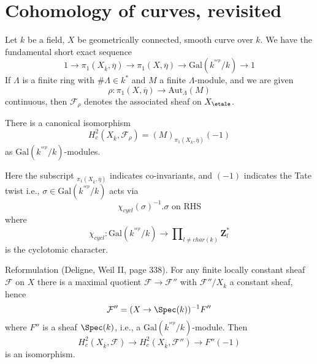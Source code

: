 \section{Cohomology of curves, revisited}
\label{section-cohomology-curves-revisited}

\noindent
Let $k$ be a field, $X$ be geometrically connected, smooth curve over $k$.
We have the fundamental short exact sequence
$$
1 \to
\pi_1(X_{\overline k}, \overline \eta) \to
\pi_1(X, \overline\eta) \to
\text{Gal}(k^{^{sep}}/k) \to 1
$$
If $\Lambda$ is a finite ring with $\#\Lambda\in k^*$ and $M$ a finite
$\Lambda$-module, and we are given
$$
\rho:\pi_1(X, \overline\eta) \to \text{Aut}_{\Lambda}(M)
$$
continuous, then $\mathcal{F}_\rho$ denotes the associated sheaf on
$X_\etale$.

\begin{lemma}
\label{lemma-identify-h2c}
There is a canonical isomorphism
$$
H_c^2(X_{\overline k}, \mathcal{F}_\rho)=(M)_{\pi_1(X_{\overline k},
\overline\eta)}(-1)
$$
as $\text{Gal}(k^{^{sep}}/k)$-modules.
\end{lemma}

\noindent
Here the subscript ${}_{\pi_1(X_{\overline k}, \overline\eta)}$
indicates co-invariants, and $(-1)$ indicates the Tate twist i.e.,
$\sigma\in \text{Gal}(k^{^{sep}}/k)$ acts via
$$
\chi_{cycl}(\sigma)^{-1}.\sigma\text{ on RHS}
$$
where
$$
\chi_{cycl} :
\text{Gal}(k^{^{sep}}/k)
\to
\prod\nolimits_{l\neq char(k)}\mathbf{Z}_l^*
$$
is the cyclotomic character.

\medskip\noindent
Reformulation (Deligne, Weil II, page 338). For any finite locally
constant sheaf $\mathcal{F}$ on $X$ there is a maximal quotient $\mathcal{F}\to
\mathcal{F}''$ with $\mathcal{F}''/X_{\overline k}$ a constant sheaf, hence
$$
\mathcal{F}'' = (X\to \Spec(k))^{-1}F''
$$
where $F''$ is a sheaf $\Spec(k)$, i.e., a
$\text{Gal}(k^{^{sep}}/k)$-module. Then
$$
H_c^2(X_{\overline k}, \mathcal{F})\to H_c^2(X_{\overline k},
\mathcal{F}'')\to F''(-1)
$$
is an isomorphism.

